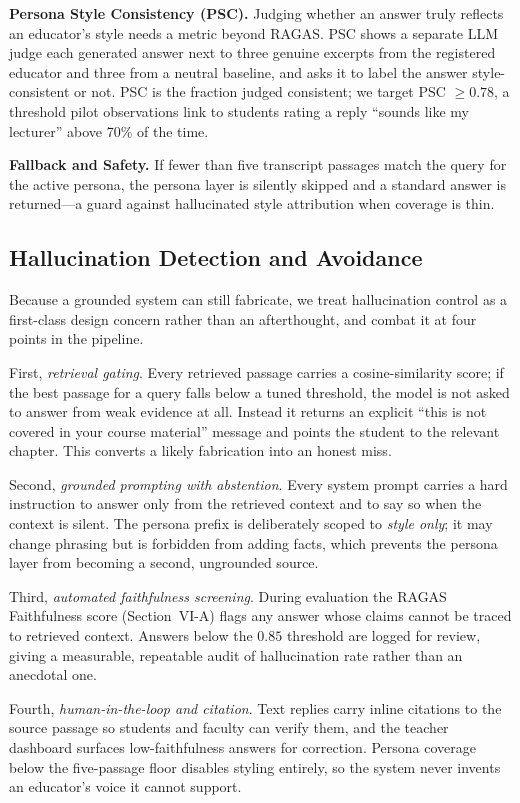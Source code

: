 \documentclass[conference]{IEEEtran}
\begin{document}
\textbf{Persona Style Consistency (PSC).} Judging whether an answer
truly reflects an educator's style needs a metric beyond RAGAS. PSC
shows a separate LLM judge each generated answer next to three genuine
excerpts from the registered educator and three from a neutral
baseline, and asks it to label the answer style-consistent or not. PSC
is the fraction judged consistent; we target PSC $\geq 0.78$, a
threshold pilot observations link to students rating a reply ``sounds
like my lecturer'' above 70\% of the time.

\textbf{Fallback and Safety.} If fewer than five transcript passages
match the query for the active persona, the persona layer is silently
skipped and a standard answer is returned---a guard against
hallucinated style attribution when coverage is thin.

\subsection{Hallucination Detection and Avoidance}
Because a grounded system can still fabricate, we treat hallucination
control as a first-class design concern rather than an afterthought,
and combat it at four points in the pipeline.

First, \emph{retrieval gating}. Every retrieved passage carries a
cosine-similarity score; if the best passage for a query falls below a
tuned threshold, the model is not asked to answer from weak evidence at
all. Instead it returns an explicit ``this is not covered in your
course material'' message and points the student to the relevant
chapter. This converts a likely fabrication into an honest miss.

Second, \emph{grounded prompting with abstention}. Every system prompt
carries a hard instruction to answer only from the retrieved context
and to say so when the context is silent. The persona prefix is
deliberately scoped to \emph{style only}; it may change phrasing but is
forbidden from adding facts, which prevents the persona layer from
becoming a second, ungrounded source.

Third, \emph{automated faithfulness screening}. During evaluation the
RAGAS Faithfulness score (Section~VI-A) flags any answer whose claims
cannot be traced to retrieved context. Answers below the $0.85$
threshold are logged for review, giving a measurable, repeatable audit
of hallucination rate rather than an anecdotal one.

Fourth, \emph{human-in-the-loop and citation}. Text replies carry
inline citations to the source passage so students and faculty can
verify them, and the teacher dashboard surfaces low-faithfulness
answers for correction. Persona coverage below the five-passage floor
disables styling entirely, so the system never invents an educator's
voice it cannot support.
\end{document}
